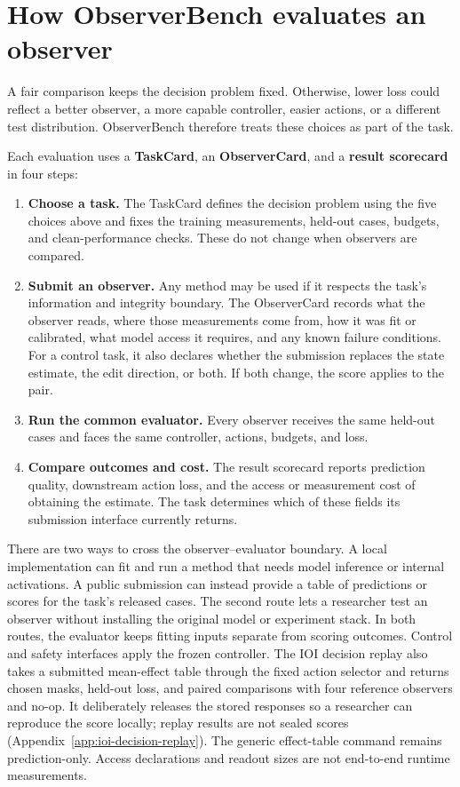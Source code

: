 \section{How ObserverBench evaluates an observer}
\label{sec:artifact}

A fair comparison keeps the decision problem fixed. Otherwise, lower loss
could reflect a better observer, a more capable controller, easier actions, or
a different test distribution. ObserverBench therefore treats these choices
as part of the task.

Each evaluation uses a \textbf{TaskCard}, an \textbf{ObserverCard}, and a
\textbf{result scorecard} in four steps:

\begin{enumerate}[leftmargin=1.4em,itemsep=0.2em,topsep=0.3em]
  \item \textbf{Choose a task.} The TaskCard defines the decision problem using
  the five choices above and fixes the training measurements, held-out cases,
  budgets, and clean-performance checks. These do not change when observers
  are compared.
  \item \textbf{Submit an observer.} Any method may be used if it respects the
  task's information and integrity boundary. The ObserverCard records what the
  observer reads, where those measurements come from, how it was fit or
  calibrated, what model access it requires, and any known failure conditions.
  For a control task, it also declares whether the submission replaces the
  state estimate, the edit direction, or both. If both change, the score applies
  to the pair.
  \item \textbf{Run the common evaluator.} Every observer receives the same
  held-out cases and faces the same controller, actions, budgets, and loss.
  \item \textbf{Compare outcomes and cost.} The result scorecard reports prediction
  quality, downstream action loss, and the access or measurement cost of
  obtaining the estimate. The task determines which of these fields its
  submission interface currently returns.
\end{enumerate}

There are two ways to cross the observer--evaluator boundary. A local
implementation can fit and run a method that needs model inference or internal
activations. A public submission can instead provide a table of predictions or
scores for the task's released cases. The second route lets a researcher test
an observer without installing the original model or experiment stack. In both
routes, the evaluator keeps fitting inputs separate from scoring outcomes.
Control and safety interfaces apply the frozen controller. The IOI decision
replay also takes a submitted mean-effect table through the fixed action
selector and returns chosen masks, held-out loss, and paired comparisons with
four reference observers and no-op. It deliberately releases the stored
responses so a researcher can reproduce the score locally; replay results
are not sealed scores (Appendix~\ref{app:ioi-decision-replay}). The generic
effect-table command remains prediction-only. Access declarations and readout
sizes are not end-to-end runtime measurements.

